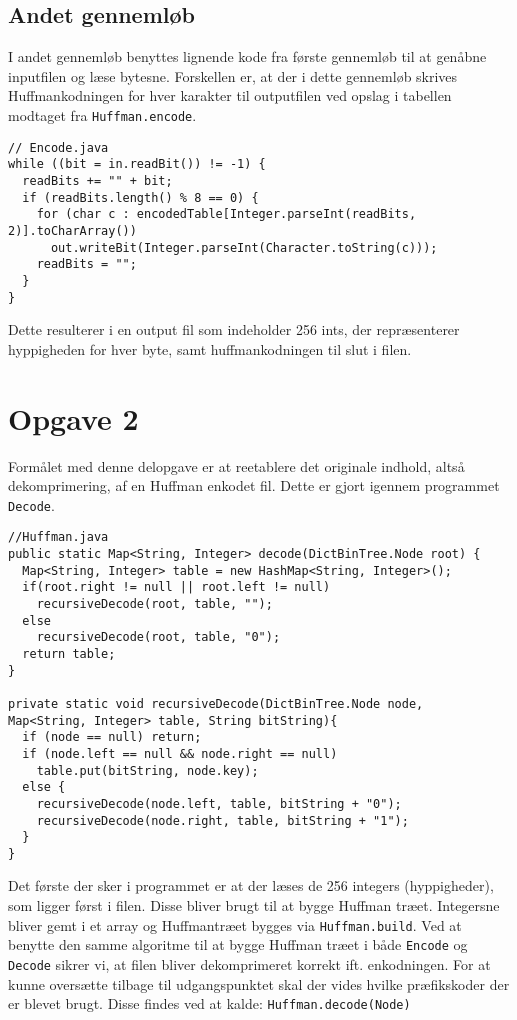 \documentclass{article}
\begin{document}
\subsection*{Andet gennemløb}
I andet gennemløb benyttes lignende kode fra første gennemløb til at genåbne inputfilen og læse bytesne. Forskellen er, at der i dette gennemløb skrives Huffmankodningen for hver karakter til outputfilen ved opslag i tabellen modtaget fra \texttt{Huffman.encode}.

\begin{lstlisting}
// Encode.java
while ((bit = in.readBit()) != -1) {
  readBits += "" + bit;
  if (readBits.length() % 8 == 0) {
    for (char c : encodedTable[Integer.parseInt(readBits, 2)].toCharArray())
      out.writeBit(Integer.parseInt(Character.toString(c)));
    readBits = "";
  }
}
\end{lstlisting}

Dette resulterer i en output fil som indeholder 256 ints, der repræsenterer hyppigheden for hver byte, samt huffmankodningen til slut i filen.

\section*{Opgave 2}
Formålet med denne delopgave er at reetablere det originale indhold, altså dekomprimering, af en Huffman enkodet fil. Dette er gjort igennem programmet \texttt{Decode}.

\begin{lstlisting}
//Huffman.java
public static Map<String, Integer> decode(DictBinTree.Node root) {
  Map<String, Integer> table = new HashMap<String, Integer>();
  if(root.right != null || root.left != null)
    recursiveDecode(root, table, "");
  else
    recursiveDecode(root, table, "0");
  return table;
}

private static void recursiveDecode(DictBinTree.Node node, 
Map<String, Integer> table, String bitString){
  if (node == null) return;
  if (node.left == null && node.right == null)
    table.put(bitString, node.key);
  else {
    recursiveDecode(node.left, table, bitString + "0");
    recursiveDecode(node.right, table, bitString + "1");
  }
}
\end{lstlisting}

Det første der sker i programmet er at der læses de 256 integers (hyppigheder), som ligger først i filen. Disse bliver brugt til at bygge Huffman træet. Integersne bliver gemt i et array og Huffmantræet bygges via \texttt{Huffman.build}. Ved at benytte den samme algoritme til at bygge Huffman træet i både \texttt{Encode} og \texttt{Decode} sikrer vi, at filen bliver dekomprimeret korrekt ift. enkodningen. 
For at kunne oversætte tilbage til udgangspunktet skal der vides hvilke præfikskoder der er blevet brugt. Disse findes ved at kalde: \texttt{Huffman.decode(Node)}
\end{document}

